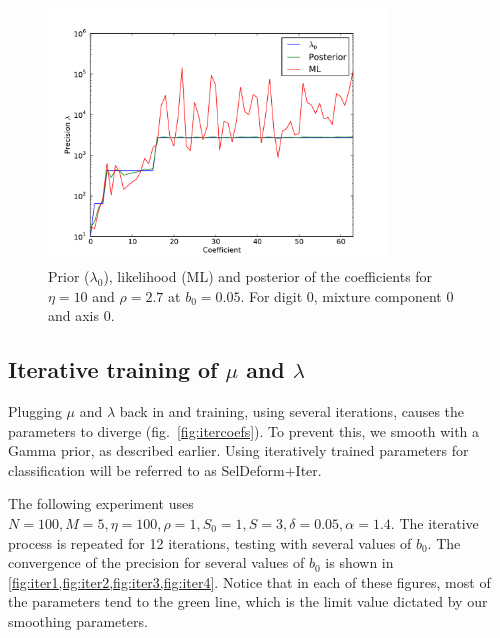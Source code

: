\documentclass{report}
\begin{document}
\begin{figure}
    \centering
    \includegraphics[width=0.8\textwidth]{figs/plotb000-eta10-rho2-7.pdf}
    \caption{Prior ($\lambda_0$), likelihood (ML) and posterior of the coefficients for $\eta=10$ and $\rho=2.7$ at $b_0 = 0.05$. For digit 0, mixture component 0 and axis 0.} \label{fig:rho27}
\end{figure}


\subsection{Iterative training of $\mu$ and $\lambda$}
Plugging $\mu$ and $\lambda$ back in and training, using several iterations, causes the parameters to diverge (fig.~\ref{fig:itercoefs}). To prevent this, we smooth with a Gamma prior, as described earlier. Using iteratively trained parameters for classification will be referred to as SelDeform+Iter.

The following experiment uses $N=100, M=5, \eta=100, \rho=1, S_0=1, S=3, \delta=0.05, \alpha=1.4$. The iterative process is repeated for 12 iterations, testing with several values of $b_0$. The convergence of the precision for several values of $b_0$ is shown in \cref{fig:iter1,fig:iter2,fig:iter3,fig:iter4}. Notice that in each of these figures, most of the parameters tend to the green line, which is the limit value dictated by our smoothing parameters.
\end{document}

